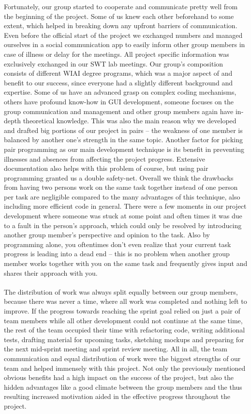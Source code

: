 Fortunately, our group started to cooperate and communicate pretty well from the beginning of the project. Some of us knew each other beforehand to some extent, which helped in breaking down any upfront barriers of communication. Even before the official start of the project we exchanged numbers and managed ourselves in a social communication app to easily inform other group members in case of illness or delay for the meetings. All project specific information was exclusively exchanged in our SWT lab meetings. Our group’s composition consists of different WIAI degree programs, which was a major aspect of and benefit to our success, since everyone had a slightly different background and expertise. Some of us have an advanced grasp on complex coding mechanisms, others have profound know-how in GUI development, someone focuses on the group communication and management and other group members again have in-depth theoretical knowledge. This was also the main reason why we developed and drafted big portions of our project in pairs – the weakness of one member is balanced by another one’s strength in the same topic. Another factor for picking pair programming as our main development technique is its benefit in preventing illnesses and absences from affecting the project progress. Extensive documentation also helps with this problem of course, but using pair programming granted us a double safety-net. Overall we think the drawbacks from having two persons work on the same task together instead of one person per task are negligible compared to the many advantages of this technique, also including more efficient code in general. There were a few moments in our project development where someone was stuck at some point and often times it was due to a fault in the person’s approach, which could only be resolved by introducing another group member’s perspective and opinion to the task. Also by programming alone, you oftentimes don’t even realize that your current task progress is leading into a dead end – this is no problem when another group member works together with you on the same task and frequently gives input and shares their approach with you. \\
\ \\
The distribution of work was always split equally between our group members, because there was never a time, where all work was completed and nothing left to improve. If the progress towards reaching the sprint goal relied on just a pair of team members while all other development could not continue at the same time, the rest of the team occupied their time with refactoring code, writing additional tests, drafting material for upcoming tasks, sketching mockups and preparing for the next mid-sprint meeting and sprint review meeting. All in all, the team communication and equal distribution of work were the biggest strengths of our team and helped immensely with this project. Not only the previously mentioned obvious benefits had a high impact on the success of the project, but also the hidden advantages like a good climate between the group members and the thus resulting increased motivation aided in the effective progress throughout the project.\\

